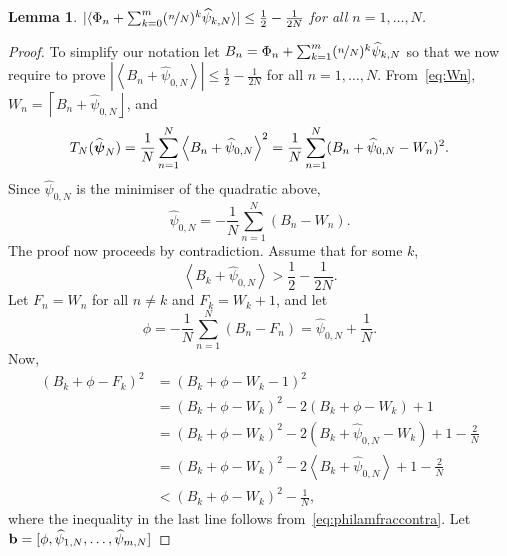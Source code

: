 \documentclass[aap,preprint]{imsart}
\newcommand{\fracpart}[1]{\left\langle #1 \right\rangle}
\newcommand{\sfracpart}[1]{\langle #1 \rangle}
\newcommand{\abs}[1]{\left\vert #1 \right\vert}
\newcommand{\sabs}[1]{\vert #1 \vert}
\newcommand{\round}[1]{{\left\lceil #1 \right\rfloor}}
\newtheorem{lemma}{Lemma}
\begin{document}
\begin{lemma}\label{lem:boundonhatlambda} $\sabs{\sfracpart{\Phi_n + \sum_{k=0}^m (\nicefrac{n}{N})^k \widehat{\psi}_{k,N}}} \leq \frac{1}{2} - \frac{1}{2N}$ for all $n = 1, \dots, N$.
\end{lemma}
\begin{proof}
To simplify our notation let $B_n = \Phi_n + \sum_{k=1}^m (\nicefrac{n}{N})^k \widehat{\psi}_{k,N}$ so that we now require to prove $\abs{\fracpart{B_n + \widehat{\psi}_{0,N}}} \leq \frac{1}{2} - \frac{1}{2N}$ for all $n = 1, \dots, N$.  From~\eqref{eq:Wn}, $W_n = \round{B_n + \widehat{\psi}_{0,N}}$, and 
\begin{align*}
T_N(\widehat{\psibf}_N) = \frac{1}{N}\sum_{n=1}^N \fracpart{B_n + \widehat{\psi}_{0,N}}^2= \frac{1}{N}\sum_{n=1}^N (B_n + \widehat{\psi}_{0,N} - W_n)^2.
\end{align*}
Since $\widehat{\psi}_{0,N}$ is the minimiser of the quadratic above,
\begin{equation}\label{eq:lamsum}
\widehat{\psi}_{0,N} = -\frac{1}{N}\sum_{n=1}^N(B_n - W_n).
\end{equation}
The proof now proceeds by contradiction.  Assume that for some $k$,
\begin{equation}\label{eq:philamfraccontra}
\fracpart{B_k + \widehat{\psi}_{0,N}} > \frac{1}{2} - \frac{1}{2N}.
\end{equation}
Let $F_n = W_n$ for all $n \neq k$ and $F_k = W_k + 1$, and let
\[
\phi = -\frac{1}{N}\sum_{n=1}^N(B_n - F_n) = \widehat{\psi}_{0,N} + \frac{1}{N}.
\]
Now,
\begin{align}
(B_k + \phi - F_k)^2 &= (B_k + \phi - W_k - 1)^2 \nonumber \\
&= (B_k + \phi - W_k)^2 - 2(B_k + \phi - W_k) + 1 \nonumber \\
&= (B_k + \phi - W_k)^2 - 2(B_k + \widehat{\psi}_{0,N} - W_k) + 1 - \frac{2}{N} \nonumber \\
&= (B_k + \phi - W_k)^2 - 2\fracpart{B_k + \widehat{\psi}_{0,N}} + 1 - \frac{2}{N} \nonumber \\
&< (B_k + \phi - W_k)^2 - \frac{1}{N}, \label{eq:Bkineq}
\end{align}
where the inequality in the last line follows from~\eqref{eq:philamfraccontra}. Let $\mathbf{b} = [ \phi,  \widehat{\psi}_{1,N} , \dots , \widehat{\psi}_{m,N}]$

\end{proof}
\end{document}
